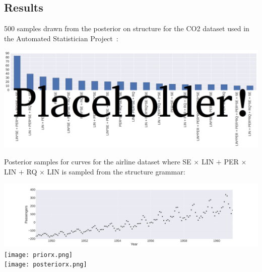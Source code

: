 \documentclass[a0,portrait]{a0poster}
\begin{document}
\begin{multicols}{3}
\begin{minipage}{\linewidth}
\end{minipage}



 
 \subsection*{Results}
 500 samples drawn from the posterior on structure for the CO2 dataset used in the Automated Statistician Project~\cite{duvenaud2013structure}:
 \begin{center}\vspace{1cm}
\includegraphics[width=0.7\linewidth]{structureCo2b.png}
\end{center}\vspace{1cm}
Posterior samples for curves for the airline dataset where SE $\times$ LIN $+$ PER $\times$ LIN $+$  RQ $\times$ LIN is sampled from the structure grammar:
 \begin{center}\vspace{1cm}
\includegraphics[width=\linewidth]{rawx.png}\\
\texttt{[image: priorx.png]}\\
\texttt{[image: posteriorx.png]}
\end{center}

 
\vfill
\columnbreak

\end{multicols}
\end{document}
